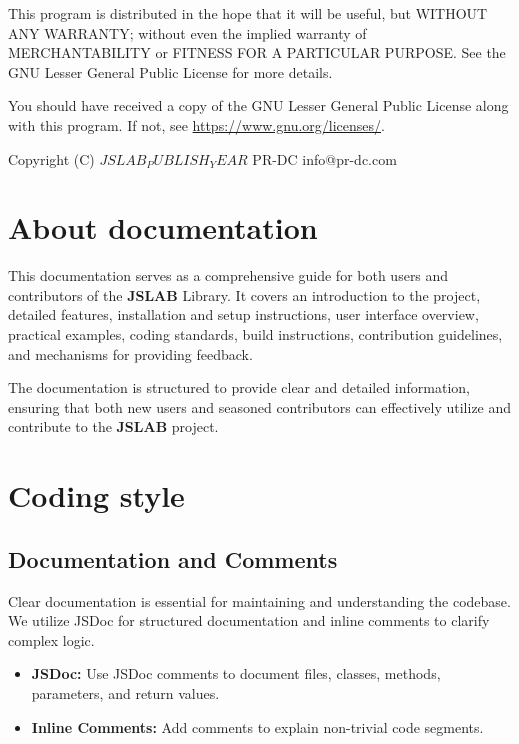\documentclass[12pt,a4paper]{article}
\newcommand{\yearvar}{$JSLAB_PUBLISH_YEAR$}
\begin{document}
This program is distributed in the hope that it will be useful, but WITHOUT ANY WARRANTY; without even the implied warranty of MERCHANTABILITY or FITNESS FOR A PARTICULAR PURPOSE. See the GNU Lesser General Public License for more details.

You should have received a copy of the GNU Lesser General Public License along with this program. If not, see \url{https://www.gnu.org/licenses/}.

\vspace{5mm}

Copyright (C) \yearvar\; PR-DC info@pr-dc.com

\vspace{8mm}

\section{About documentation}

This documentation serves as a comprehensive guide for both users and contributors of the \textbf{JSLAB} Library. It covers an introduction to the project, detailed features, installation and setup instructions, user interface overview, practical examples, coding standards, build instructions, contribution guidelines, and mechanisms for providing feedback.

The documentation is structured to provide clear and detailed information, ensuring that both new users and seasoned contributors can effectively utilize and contribute to the \textbf{JSLAB} project.

\section{Coding style}
\label{coding-style}

\subsection{Documentation and Comments}

Clear documentation is essential for maintaining and understanding the codebase. We utilize JSDoc for structured documentation and inline comments to clarify complex logic.

\begin{itemize}
  \item \textbf{JSDoc:} Use JSDoc comments to document files, classes, methods, parameters, and return values.

  \item \textbf{Inline Comments:} Add comments to explain non-trivial code segments.
\end{itemize}
\end{document}
